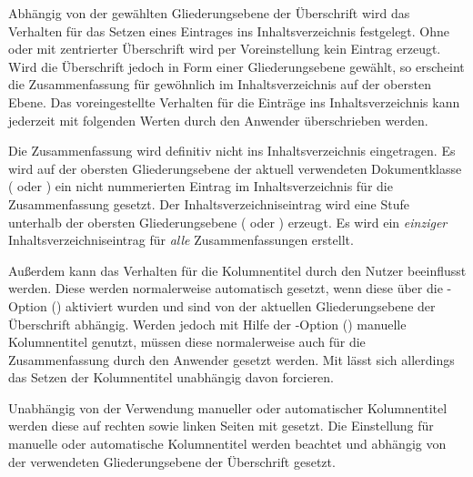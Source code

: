 \begin{DeclareEntity*}{}
\begin{DeclareEntity*}{}
\begin{DeclareEntity*}{}
\begin{Declaration}
Abhängig von der gewählten Gliederungsebene der Überschrift wird das Verhalten 
für das Setzen eines Eintrages ins Inhaltsverzeichnis festgelegt. Ohne oder mit 
zentrierter Überschrift wird per Voreinstellung kein Eintrag erzeugt. Wird die 
Überschrift jedoch in Form einer Gliederungsebene gewählt, so erscheint die 
Zusammenfassung für gewöhnlich im Inhaltsverzeichnis auf der obersten Ebene. 
Das voreingestellte Verhalten für die Einträge ins Inhaltsverzeichnis kann 
jederzeit mit folgenden Werten durch den Anwender überschrieben werden.
\begin{DeclareValues}[Inhaltsverzeichnis]
  Die Zusammenfassung wird definitiv nicht ins Inhaltsverzeichnis eingetragen.
  Es wird auf der obersten Gliederungsebene der aktuell verwendeten 
  Dokumentklasse ( oder ) ein nicht 
  nummerierten Eintrag im Inhaltsverzeichnis für die Zusammenfassung gesetzt.
  Der Inhaltsverzeichniseintrag wird eine Stufe unterhalb der obersten 
  Gliederungsebene ( oder ) erzeugt.
  Es wird ein \emph{einziger} Inhaltsverzeichniseintrag für \emph{alle} 
  Zusammenfassungen erstellt.
\end{DeclareValues}

%
%
Außerdem kann das Verhalten für die Kolumnentitel durch den Nutzer beeinflusst 
werden. Diese werden normalerweise automatisch gesetzt, wenn diese über die 
\KOMAScript-Option () aktiviert 
wurden und sind von der aktuellen Gliederungsebene der Überschrift abhängig. 
Werden jedoch mit Hilfe der \KOMAScript-Option 
() manuelle Kolumnentitel genutzt, 
müssen diese normalerweise auch für die Zusammenfassung durch den Anwender 
gesetzt werden. Mit  lässt sich allerdings das Setzen 
der Kolumnentitel unabhängig davon forcieren.
\begin{DeclareValues}[Kolumnentitel]
  Unabhängig von der Verwendung manueller oder automatischer Kolumnentitel 
  werden diese auf rechten sowie linken Seiten mit  gesetzt.
  Die Einstellung für manuelle oder automatische Kolumnentitel werden beachtet 
  und abhängig von der verwendeten Gliederungsebene der Überschrift gesetzt.
\end{DeclareValues}


\end{Declaration}
\end{DeclareEntity*}
\end{DeclareEntity*}
\end{DeclareEntity*}

